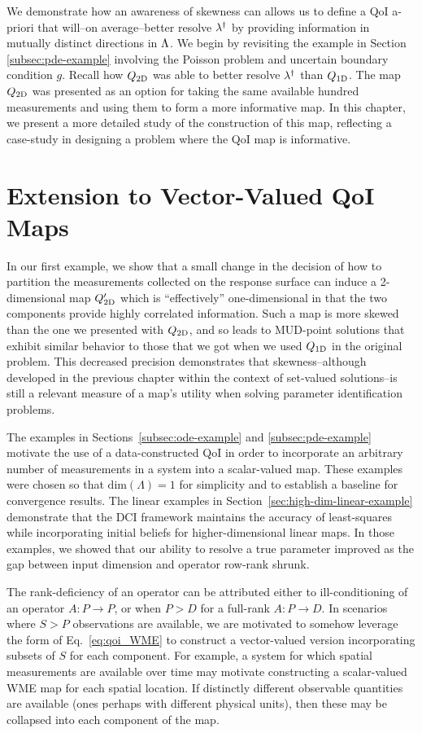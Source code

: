
We demonstrate how an awareness of skewness can allows us to define a QoI a-priori that will\---on average\---better resolve $\lambda^\dagger$ by providing information in mutually distinct directions in ${\Lambda}$.
We begin by revisiting the example in Section \ref{subsec:pde-example} involving the Poisson problem and uncertain boundary condition $g$.
Recall how $Q_\text{2D}$ was able to better resolve $\lambda^\dagger$ than $Q_\text{1D}$.
The map $Q_\text{2D}$ was presented as an option for taking the same available hundred measurements and using them to form a more informative map.
In this chapter, we present a more detailed study of the construction of this map, reflecting a case-study in designing a problem where the QoI map is informative.

\section{Extension to Vector-Valued QoI Maps}
In our first example, we show that a small change in the decision of how to partition the measurements collected on the response surface can induce a 2-dimensional map $Q_\text{2D}^\prime$ which is ``effectively'' one-dimensional in that the two components provide highly correlated information.
Such a map is more skewed than the one we presented with $Q_\text{2D}$, and so leads to MUD-point solutions that exhibit similar behavior to those that we got when we used $Q_\text{1D}$ in the original problem.
This decreased precision demonstrates that skewness\---although developed in the previous chapter within the context of set-valued solutions\---is still a relevant measure of a map's utility when solving parameter identification problems.

The examples in Sections~\ref{subsec:ode-example} and \ref{subsec:pde-example} motivate the use of a data-constructed QoI in order to incorporate an arbitrary number of measurements in a system into a scalar-valued map.
These examples were chosen so that $\text{dim}({\Lambda}) = 1$ for simplicity and to establish a baseline for convergence results.
The linear examples in Section~\ref{sec:high-dim-linear-example} demonstrate that the DCI framework maintains the accuracy of least-squares while incorporating initial beliefs for higher-dimensional linear maps.
In those examples, we showed that our ability to resolve a true parameter improved as the gap between input dimension and operator row-rank shrunk.

The rank-deficiency of an operator can be attributed either to ill-conditioning of an operator $A:P\to P$, or when $P>D$ for a full-rank $A:P\to D$.
In scenarios where $S>P$ observations are available, we are motivated to somehow leverage the form of Eq.~\eqref{eq:qoi_WME} to construct a vector-valued version incorporating subsets of $S$ for each component.
For example, a system for which spatial measurements are available over time may motivate constructing a scalar-valued WME map for each spatial location.
If distinctly different observable quantities are available (ones perhaps with different physical units), then these may be collapsed into each component of the map.


